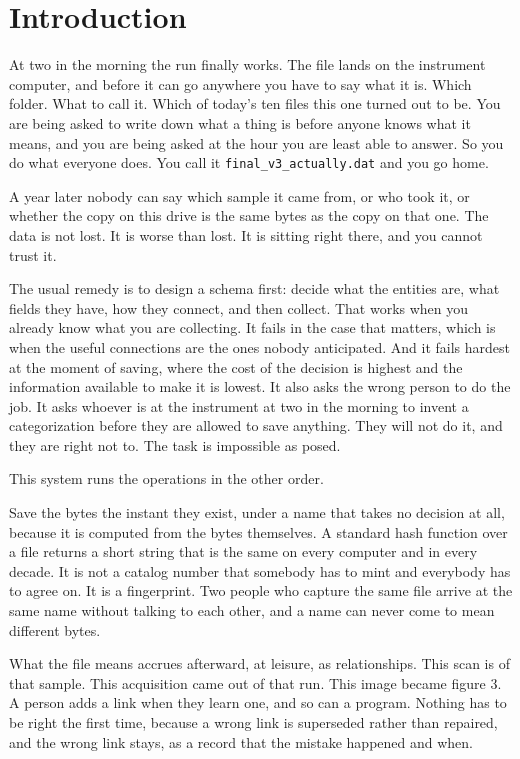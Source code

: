 \chapter*{Introduction}

At two in the morning the run finally works. The file lands on the instrument computer, and before it can go anywhere you have to say what it is. Which folder. What to call it. Which of today's ten files this one turned out to be. You are being asked to write down what a thing is before anyone knows what it means, and you are being asked at the hour you are least able to answer. So you do what everyone does. You call it \texttt{final\_v3\_actually.dat} and you go home.

A year later nobody can say which sample it came from, or who took it, or whether the copy on this drive is the same bytes as the copy on that one. The data is not lost. It is worse than lost. It is sitting right there, and you cannot trust it.

The usual remedy is to design a schema first: decide what the entities are, what fields they have, how they connect, and then collect. That works when you already know what you are collecting. It fails in the case that matters, which is when the useful connections are the ones nobody anticipated. And it fails hardest at the moment of saving, where the cost of the decision is highest and the information available to make it is lowest. It also asks the wrong person to do the job. It asks whoever is at the instrument at two in the morning to invent a categorization before they are allowed to save anything. They will not do it, and they are right not to. The task is impossible as posed.

This system runs the operations in the other order.

Save the bytes the instant they exist, under a name that takes no decision at all, because it is computed from the bytes themselves. A standard hash function over a file returns a short string that is the same on every computer and in every decade. It is not a catalog number that somebody has to mint and everybody has to agree on. It is a fingerprint. Two people who capture the same file arrive at the same name without talking to each other, and a name can never come to mean different bytes.

What the file means accrues afterward, at leisure, as relationships. This scan is of that sample. This acquisition came out of that run. This image became figure 3. A person adds a link when they learn one, and so can a program. Nothing has to be right the first time, because a wrong link is superseded rather than repaired, and the wrong link stays, as a record that the mistake happened and when.

